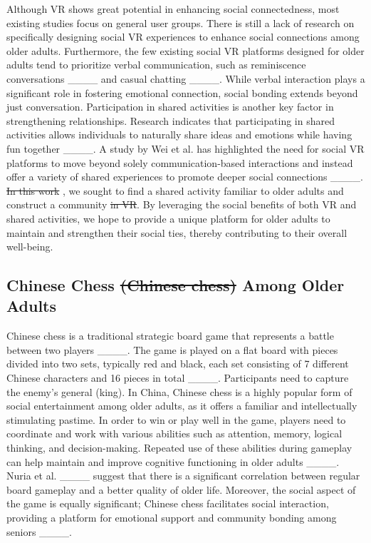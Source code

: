 Although VR shows great potential in enhancing social connectedness, most existing studies focus on general user groups. There is still a lack of research on specifically designing social VR experiences to enhance social connections among older adults. Furthermore, the few existing social VR platforms designed for older adults tend to prioritize verbal communication, such as reminiscence conversations ____ and casual chatting ____. While verbal interaction plays a significant role in fostering emotional connection, social bonding extends beyond just conversation. Participation in shared activities is another key factor in strengthening relationships. Research indicates that participating in shared activities allows individuals to naturally share ideas and emotions while having fun together ____. A study by Wei et al. has highlighted the need for social VR platforms to move beyond solely communication-based interactions and instead offer a variety of shared experiences to promote deeper social connections ____.
\sout{In this work} , we sought to find a shared activity familiar to older adults and construct a  community \sout{in VR}. By leveraging the social benefits of both VR and shared activities, we hope to provide a unique platform for older adults to maintain and strengthen their social ties, thereby contributing to their overall well-being.

\subsection{Chinese Chess \sout{(Chinese chess)} Among Older Adults}

Chinese chess is a traditional strategic board game that represents a battle between two players ____. The game is played on a flat board with pieces divided into two sets, typically red and black, each set consisting of 7 different Chinese characters and 16 pieces in total ____. Participants need to capture the enemy's general (king). In China, Chinese chess is a highly popular form of social entertainment among older adults, as it offers a familiar and intellectually stimulating pastime. In order to win or play well in the game, players need to coordinate and work with various abilities such as attention, memory, logical thinking, and decision-making. Repeated use of these abilities during gameplay can help maintain and improve cognitive functioning in older adults ____. Nuria et al. ____ suggest that there is a significant correlation between regular board gameplay and a better quality of older life. Moreover, the social aspect of the game is equally significant; Chinese chess facilitates social interaction, providing a platform for emotional support and community bonding among seniors ____.

